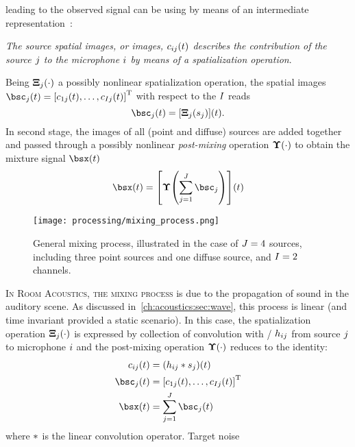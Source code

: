  leading to the observed signal can be
using by means of an intermediate representation~\cite{sturmel2012linear}:
\begin{center}
    \textit{The \emph{source spatial images}, or \emph{images},  $c_{ij}(t)$ describes the contribution
    of the source $j$ to the microphone $i$ by means of a spatialization
    operation}.
\end{center}
Being $\boldsymbol{\Xi}_{j}(\cdot)$ a possibly nonlinear spatialization operation, the spatial images
$\imgs_\idxSrc(t) = \ktranspose{\klist{\img_{1\idxSrc}(t), \dots, \img_{\numMics\idxSrc}(t)}}$ with respect to the $I$ reads
\begin{equation}
    \imgs_\idxSrc(t) = \kbracket{\spat_\idxSrc(\src_\idxSrc)}(t)
    .
\end{equation}
In second stage, the images of all (point and diffuse) sources are added together and passed through a possibly
nonlinear \textit{post-mixing} operation $\boldsymbol{\Upsilon}(\cdot)$ to obtain the mixture signal $\mics(t)$
\begin{equation}
    \mics(t) = \kbracket{ \master\kparen{
                    \sum_{\idxSrc=1}^{\numSrcs} \imgs_\idxSrc
                    }}(t)
\end{equation}
\begin{figure}[t]
    \centering
    \texttt{[image: processing/mixing\_process.png]}
    \caption{General mixing process,
    illustrated in the case of $J = 4$ sources,
    including three point sources and one diffuse source, and $I = 2$ channels.}
    \label{fig:processing:mixing}
\end{figure}
\textsc{In Room Acoustics, the mixing process} is due to the propagation of sound in the auditory scene.
As discussed in~\cref{ch:acoustics:sec:wave}, this process is linear (and time invariant provided a static scenario).
In this case, the spatialization operation $\boldsymbol{\Xi}_{j}(\cdot)$ is expressed by
collection of convolution with \RIR/ $h_{ij}$
from source $j$ to microphone $i$ and the post-mixing operation $\boldsymbol{\Upsilon}(\cdot)$ reduces to the identity:
\begin{align}
    \img_{\idxMic\idxSrc}(t) &=  \kparen{h_{\idxMic\idxSrc} \conv \src_\idxSrc} (t) \\
    \imgs_\idxSrc(t) &=  \ktranspose{\klist{\img_{1\idxSrc}(t), \dots, \img_{\numMics\idxSrc}(t)}}\\
    \mics(t)         &= \sum_{\idxSrc=1}^{\numSrcs} \imgs_\idxSrc(t)
\end{align}
where $\ast$ is the linear convolution operator.
%
Target noise

